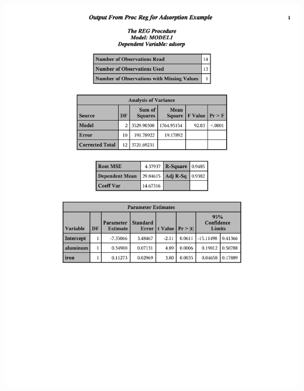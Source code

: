 \begin{center}
\includegraphics[page=1,scale=0.55,trim = 20mm 70mm 20mm 20mm]{mlradexp}\\
\end{center}

